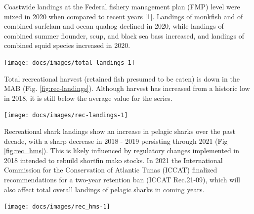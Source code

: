 \documentclass[
  10pt,
]{article}
\let\origfigure\figure
\let\endorigfigure\endfigure
\renewenvironment{figure}[1][2] {
    \expandafter\origfigure\expandafter[H]
} {
    \endorigfigure
}
\begin{document}
Coastwide landings at the Federal fishery management plan (FMP) level
were mixed in 2020 when compared to recent years
{[}\protect\hyperlink{ref-thunberg_northeast_2021}{1}{]}. Landings of
monkfish and of combined surfclam and ocean quahog declined in 2020,
while landings of combined summer flounder, scup, and black sea bass
increased, and landings of combined squid species increased in 2020.

\begin{figure}

{\centering \texttt{[image: docs/images/total-landings-1]} 

}

\caption{Total commercial seafood landings through 2019 (black) and Mid-Atlantic managed seafood landings (red).}\label{fig:total-landings}
\end{figure}

Total recreational harvest (retained fish presumed to be eaten) is down
in the MAB (Fig. \ref{fig:rec-landings}). Although harvest has increased
from a historic low in 2018, it is still below the average value for the
series.

\begin{figure}

{\centering \texttt{[image: docs/images/rec-landings-1]} 

}

\caption{Total recreational seafood harvest (millions of pounds) in the Mid-Atlantic region.}\label{fig:rec-landings}
\end{figure}

Recreational shark landings show an increase in pelagic sharks over the
past decade, with a sharp decrease in 2018 - 2019 persisting through
2021 (Fig \ref{fig:rec_hms}). This is likely influenced by regulatory
changes implemented in 2018 intended to rebuild shortfin mako stocks. In
2021 the International Commission for the Conservation of Atlantic Tunas
(ICCAT) finalized recommendations for a two-year retention ban (ICCAT
Rec.21-09), which will also affect total overall landings of pelagic
sharks in coming years.

\begin{figure}

{\centering \texttt{[image: docs/images/rec\_hms-1]} 

}

\caption{Recreational shark landings from Marine Recreational Information Program.}\label{fig:rec_hms}
\end{figure}
\end{document}
